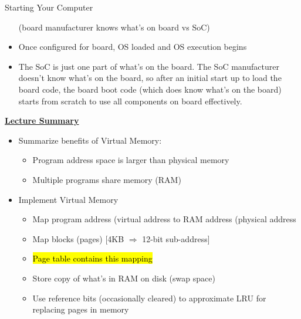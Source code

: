 \begin{Lecture}{Starting Your Computer}
\begin{frame}[fragile]
\begin{itemize}
		 (board manufacturer knows what's on board vs SoC)
	\item Once configured for board, OS loaded and OS execution begins
\end{itemize}
\BNotes\ifnum{}
\begin{itemize}
	\item The SoC is just one part of what's on the board.  The SoC 
		manufacturer doesn't know what's on the board, so after an initial
		start up to load the board code, the board boot code (which does
        know what's on the board) starts from
		scratch to use all components on board effectively.
\end{itemize}
\fi\ENotes
\end{frame}

\begin{frame}[fragile]
 \underline{\textbf{Lecture Summary}}
 \begin{itemize}
\item Summarize benefits of Virtual Memory:
\begin{itemize}
  \item Program address space is larger than physical memory
  \item Multiple programs share memory (RAM)
\end{itemize}
\item Implement Virtual Memory
  \begin{itemize}
  \item Map program address (virtual address to RAM address (physical address
  \item Map blocks (pages) [4KB $\Rightarrow$ 12-bit sub-address]
  \item \hl{Page table contains this mapping}
  \item Store copy of what's in RAM on disk (swap space)
  \item Use reference bits (occasionally cleared) to approximate LRU for replacing pages in memory
  \end{itemize}
\end{itemize}


\end{frame}
\end{Lecture}
